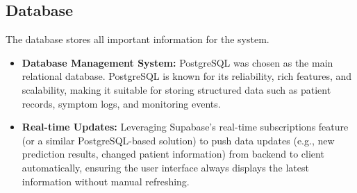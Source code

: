 \subsection{Database}

The database stores all important information for the system.
\begin{itemize}
    \item \textbf{Database Management System:} PostgreSQL was chosen as the main relational database. PostgreSQL is known for its reliability, rich features, and scalability, making it suitable for storing structured data such as patient records, symptom logs, and monitoring events.
    \item \textbf{Real-time Updates:} Leveraging Supabase's real-time subscriptions feature (or a similar PostgreSQL-based solution) to push data updates (e.g., new prediction results, changed patient information) from backend to client automatically, ensuring the user interface always displays the latest information without manual refreshing.
\end{itemize}
